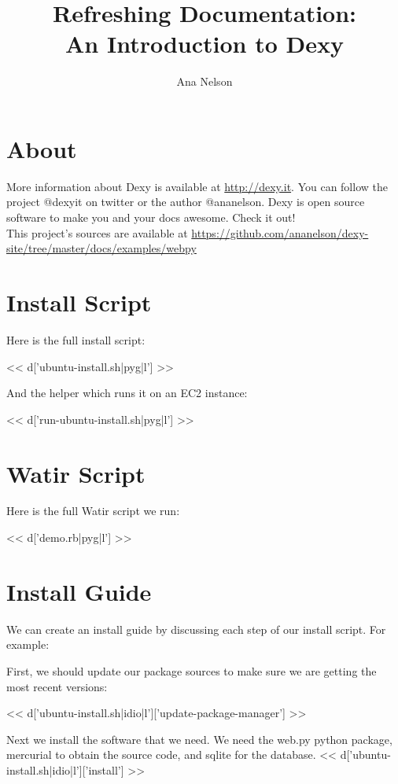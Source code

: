 \documentclass[a4paper]{tufte-handout}
\title{Refreshing Documentation:\\An Introduction to Dexy}
\author{Ana Nelson}
\begin{document}
\maketitle

\section{About}
More information about Dexy is available at \url{http://dexy.it}. You can follow the project @dexyit on twitter or the author @ananelson. Dexy is open source software to make you and your docs awesome. Check it out!
\\This project's sources are available at \url{https://github.com/ananelson/dexy-site/tree/master/docs/examples/webpy}

\section{Install Script}

Here is the full install script:

\scriptsize
<< d['ubuntu-install.sh|pyg|l'] >>
\normalsize

And the helper which runs it on an EC2 instance:

\scriptsize
<< d['run-ubuntu-install.sh|pyg|l'] >>
\normalsize

\section{Watir Script}

Here is the full Watir script we run:

\scriptsize
<< d['demo.rb|pyg|l'] >>
\normalsize

\section{Install Guide}

We can create an install guide by discussing each step of our install script. For example:

\sffamily

First, we should update our package sources to make sure we are getting the most recent versions:

\scriptsize
<< d['ubuntu-install.sh|idio|l']['update-package-manager'] >>
\normalsize

Next we install the software that we need. We need the web.py python package, mercurial to obtain the source code, and sqlite for the database.
\scriptsize
<< d['ubuntu-install.sh|idio|l']['install'] >>
\normalsize
\end{document}
